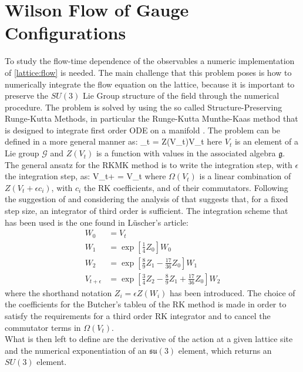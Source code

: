 \section{Wilson Flow of Gauge Configurations}
To study the flow-time dependence of the observables a numeric implementation of \cref{lattice:flow} is needed. The main challenge that this problem poses is how to numerically integrate the flow equation on the lattice, because it is important to preserve the $SU(3)$ Lie Group structure of the field through the numerical procedure. The problem is solved by using the so called Structure-Preserving Runge-Kutta Methods, in particular the Runge-Kutta Munthe-Kaas method that is designed to integrate first order ODE on a manifold \cite{munthe-kaas_runge-kutta_1998,munthe-kaas_lie-butcher_1995,celledoni_introduction_2014}. The problem can be defined in a more general manner as:
\beq
    _t =  Z(V_t)V_t
\eeq
here $V_t$ is an element of a Lie group $\mathcal{G}$ and $Z(V_t)$ is a function with values in the associated algebra $\mathfrak{g}$. The general ansatz for the RKMK method is to write the integration step, with $\epsilon$ the integration step,  as:
\beq
    V_{t+\epsilon} =   V_t
\eeq
where $\Omega(V_t)$ is a linear combination of $Z(V_t + \epsilon c_i)$, with $c_i$ the RK coefficients, and of their commutators. 
Following the suggestion of \cite{luscher_properties_2010} and considering the analysis of \cite{ce_non-gaussianities_2015} that suggests that, for a fixed step size, an integrator of third order is sufficient. The integration scheme that has been used is the one found in L{\"u}scher's article:
\begin{align}
    \label{eq:integrator}
    W_0 &= V_t\\\nonumber
    W_1 &= \exp\left[ \frac{1}{4}Z_0 \right] W_0 \\\nonumber
    W_2 &= \exp\left[ \frac{8}{9}Z_1 - \frac{17}{36}Z_0 \right] W_1\\\nonumber
    V_{t+\epsilon} &= \exp\left[ \frac{3}{4}Z_2 - \frac{8}{9}Z_1 + \frac{17}{36}Z_0\right] W_2
\end{align}
where the shorthand notation $Z_i = \epsilon Z(W_i)$ has been introduced. The choice of the coefficients for the Butcher's tableu of the RK method is made in order to satisfy the requirements for a third order RK integrator and to cancel the commutator terms in $\Omega(V_t)$. \\
What is then left to define are the derivative of the action at a given lattice site and the numerical exponentiation of an $\mathfrak{su}(3)$ element, which returns an $SU(3)$ element.
